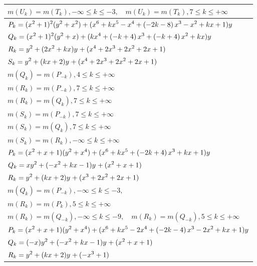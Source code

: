 \documentclass{amsart}
\begin{document}
\begin{longtable}{|l|}
\(\displaystyle m(U_k) = m(T_{k}),-\infty \leqslant k \leqslant -3,\quad m(U_k) = m(T_{k}),7 \leqslant k \leqslant +\infty\)\\
\hline
\(\displaystyle P_k=(x^2
 + 1)^{2}(y^2+x^2)+(x^6
 + k\*x^5
 - x^4
 + \left(-2\*k
 - 8\right) \*x^3
 - x^2
 + k\*x
 + 1)y\)\\
\(\displaystyle Q_k=(x^2
 + 1)^{2}(y^2+x)+(k\*x^4
 + \left(-k
 + 4\right) \*x^3
 + \left(-k
 + 4\right) \*x^2
 + k\*x)y\)\\
\(\displaystyle R_k=y^{2}+(2\*x^2
 + k\*x)y^{}+(x^4
 + 2\*x^3
 + 2\*x^2
 + 2\*x
 + 1)\)\\
\(\displaystyle S_k=y^{2}+(k\*x
 + 2)y^{}+(x^4
 + 2\*x^3
 + 2\*x^2
 + 2\*x
 + 1)\)\\
\(\displaystyle m(Q_k) = m(P_{-k}),4 \leqslant k \leqslant +\infty\)\\
\(\displaystyle m(R_k) = m(P_{-k}),7 \leqslant k \leqslant +\infty\)\\
\(\displaystyle m(R_k) = m(Q_{k}),7 \leqslant k \leqslant +\infty\)\\
\(\displaystyle m(S_k) = m(P_{-k}),7 \leqslant k \leqslant +\infty\)\\
\(\displaystyle m(S_k) = m(Q_{k}),7 \leqslant k \leqslant +\infty\)\\
\(\displaystyle m(S_k) = m(R_{k}),-\infty \leqslant k \leqslant +\infty\)\\
\hline
\(\displaystyle P_k=(x^2
 + x
 + 1)(y^2+x^4)+(x^6
 + k\*x^5
 + \left(-2\*k
 + 4\right) \*x^3
 + k\*x
 + 1)y\)\\
\(\displaystyle Q_k=xy^{2}+(-x^2
 + k\*x
 - 1)y^{}+(x^2
 + x
 + 1)\)\\
\(\displaystyle R_k=y^{2}+(k\*x
 + 2)y^{}+(x^3
 + 2\*x^2
 + 2\*x
 + 1)\)\\
\(\displaystyle m(Q_k) = m(P_{-k}),-\infty \leqslant k \leqslant -3,\quad \)\\
\(\displaystyle m(R_k) = m(P_{k}),5 \leqslant k \leqslant +\infty\)\\
\(\displaystyle m(R_k) = m(Q_{-k}),-\infty \leqslant k \leqslant -9,\quad m(R_k) = m(Q_{-k}),5 \leqslant k \leqslant +\infty\)\\
\hline
\(\displaystyle P_k=(x^2
 + x
 + 1)(y^2+x^4)+(x^6
 + k\*x^5
 - 2\*x^4
 + \left(-2\*k
 - 4\right) \*x^3
 - 2\*x^2
 + k\*x
 + 1)y\)\\
\(\displaystyle Q_k=(-x)y^{2}+(-x^2
 + k\*x
 - 1)y^{}+(x^2
 + x
 + 1)\)\\
\(\displaystyle R_k=y^{2}+(k\*x
 + 2)y^{}+(-x^3
 + 1)\)\\

\end{longtable}
\end{document}

